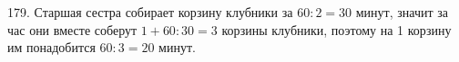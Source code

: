 179. Старшая сестра собирает корзину клубники за $60:2=30$ минут, значит за час они вместе соберут $1+60:30=3$ корзины клубники, поэтому на 1 корзину им понадобится $60:3=20$ минут.\\
